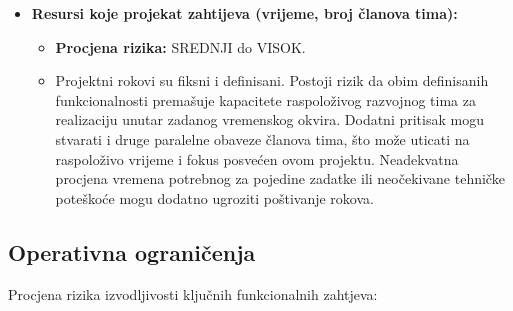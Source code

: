 \begin{itemize}
    \item \textbf{Resursi koje projekat zahtijeva (vrijeme, broj članova tima):}

    \begin{itemize}
        \item \textbf{Procjena rizika:} SREDNJI do VISOK. 
        \item Projektni rokovi su fiksni i definisani. Postoji rizik da obim definisanih funkcionalnosti premašuje kapacitete raspoloživog razvojnog tima za realizaciju unutar zadanog vremenskog okvira. Dodatni pritisak mogu stvarati i druge paralelne obaveze članova tima, što može uticati na raspoloživo vrijeme i fokus posvećen ovom projektu. Neadekvatna procjena vremena potrebnog za pojedine zadatke ili neočekivane tehničke poteškoće mogu dodatno ugroziti poštivanje rokova.
    \end{itemize}
\end{itemize}


\sloppy
\subsection{Operativna ograničenja}

Procjena rizika izvodljivosti ključnih funkcionalnih zahtjeva:

